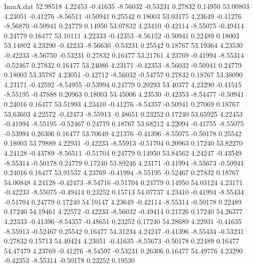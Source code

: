 \begin{filecontents}{ImuA.dat}
  52.98518    4.22453   -0.41635   -8.56032   -0.53231    0.27832    0.14950
  53.00803    4.23051   -0.41276   -8.56511   -0.50941    0.25542    0.18003
  53.03175    4.23649   -0.41276   -8.56870   -0.50941    0.24779    0.14950
  53.07832    4.23410   -0.42114   -8.55075   -0.49414    0.24779    0.16477
  53.10111    4.22333   -0.42353   -8.56152   -0.50941    0.22489    0.18003
  53.14802    4.23290   -0.42233   -8.56630   -0.53231    0.25542    0.18767
  53.19364    4.23530   -0.42233   -8.56750   -0.53231    0.27832    0.16477
  53.21761    4.23769   -0.41994   -8.55314   -0.52467    0.27832    0.16477
  53.24086    4.23171   -0.42353   -8.56032   -0.50941    0.24779    0.18003
  53.35787    4.23051   -0.42712   -8.56032   -0.54757    0.27832    0.18767
  53.38090    4.23171   -0.42592   -8.54955   -0.53994    0.24779    0.20293
  53.40377    4.23290   -0.41515   -8.55195   -0.47888    0.20963    0.18003
  53.45006    4.23530   -0.42353   -8.54477   -0.50941    0.24016    0.16477
  53.51993    4.23410   -0.41276   -8.54357   -0.50941    0.27069    0.18767
  53.63603    4.22572   -0.42473   -8.55913   -0.48651    0.23252    0.17240
  53.65925    4.22453   -0.41994   -8.55195   -0.52467    0.24779    0.18767
  53.68212    4.22094   -0.41755   -8.55075   -0.53994    0.26306    0.16477
  53.70649    4.21376   -0.41396   -8.55075   -0.50178    0.25542    0.18003
  53.79889    4.22931   -0.42233   -8.55913   -0.51704    0.20963    0.17240
  53.82270    4.24128   -0.43789   -8.56511   -0.51704    0.24779    0.14950
  53.84562    4.24247   -0.43549   -8.55314   -0.50178    0.24779    0.17240
  53.89246    4.23171   -0.41994   -8.55673   -0.50941    0.24016    0.16477
  53.91537    4.23769   -0.41994   -8.55195   -0.52467    0.27832    0.18767
  54.00848    4.24128   -0.42473   -8.54716   -0.51704    0.24779    0.14950
  54.03124    4.23171   -0.42233   -8.55075   -0.49414    0.23252    0.15713
  54.07737    4.23410   -0.41994   -8.55434   -0.51704    0.24779    0.17240
  54.10147    4.23649   -0.42114   -8.55314   -0.50178    0.22489    0.17240
  54.19461    4.22572   -0.42233   -8.56032   -0.49414    0.21726    0.17240
  54.26377    4.22333   -0.41396   -8.54357   -0.48651    0.23252    0.17240
  54.28689    4.22931   -0.41635   -8.55913   -0.52467    0.25542    0.16477
  54.31234    4.24247   -0.41396   -8.55434   -0.53231    0.27832    0.15713
  54.40424    4.23051   -0.41635   -8.55673   -0.50178    0.22489    0.16477
  54.47479    4.23769   -0.41276   -8.54597   -0.53231    0.26306    0.16477
  54.49776    4.23290   -0.42353   -8.55314   -0.50178    0.23252    0.19530

\end{filecontents}
